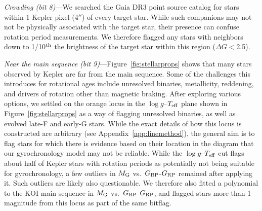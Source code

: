 \documentclass[11pt,twocolumn,tighten]{aastex63}
\begin{document}
{\it Crowding (bit 8)}---We searched the Gaia DR3 point source catalog
for stars within 1 Kepler pixel (4$''$) of every target star.  While
such companions may not not be physically associated with the target
star, their presence can confuse rotation period measurements.  We
therefore flagged any stars with neighbors down to 1/10$^{\rm th}$ the
brightness of the target star within this region ($\Delta G$$<$2.5).

{\it Near the main sequence (bit 9)}---Figure~\ref{fig:stellarprops} shows
that many stars observed by Kepler
are far from the main sequence.  Some of the challenges this introduces
for rotational ages include unresolved binaries, metallicity,
reddening, and drivers of rotation other than magnetic braking.
After exploring various options, we settled on the orange locus in the
$\log g$--$T_{\rm eff}$ plane shown in Figure~\ref{fig:stellarprops}
as a way of flagging unresolved binaries, as well as evolved
late-F and early-G stars.  While the exact details of how this locus
is constructed are arbitrary (see Appendix~\ref{app:linemethod}), the
general aim is to flag stars for which there is evidence based on
their location in the  diagram that our gyrochronology model may not
be reliable.  While the $\log g$--$T_{\rm eff}$ cut flags about half
of Kepler stars with rotation periods as potentially not being
suitable for gyrochronology, a few outliers in $M_{\rm G}$ vs.~$G_{\rm
BP}$-$G_{\rm RP}$ remained after applying it.  Such outliers are
likely also questionable.  We therefore also fitted a polynomial to
the KOI main sequence in $M_{\rm G}$ vs.~$G_{\rm
	BP}$-$G_{\rm RP}$, and flagged stars more than 1\,magnitude from
this locus as part of the same bitflag.

\end{document}
